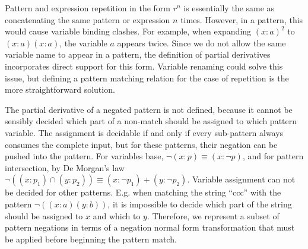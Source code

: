 Pattern and expression repetition in the form $r^n$ is essentially the same as
concatenating the same pattern or expression $n$ times. However, in a pattern,
this would cause variable binding clashes. For example, when expanding
$(x:a)^2$ to $(x:a)(x:a)$, the variable $a$ appears twice. Since we do not
allow the same variable name to appear in a pattern, the definition of partial
derivatives incorporates direct support for this form. Variable renaming could
solve this issue, but defining a pattern matching relation for the case of
repetition is the more straightforward solution.

The partial derivative of a negated pattern is not defined, because it cannot
be sensibly decided which part of a non-match should be assigned to which
pattern variable. The assignment is decidable if and only if every sub-pattern
always consumes the complete input, but for these patterns, their negation can
be pushed into the pattern. For variables base, $\neg(x:p) \equiv (x:\neg p)$,
and for pattern intersection, by De Morgan's law $\neg((x:p_1) \cap (y:p_2))
\equiv (x:\neg p_1) + (y:\neg p_2)$. Variable assignment can not be decided
for other patterns. E.g. when matching the string ``ccc'' with the pattern
$\neg((x:a)(y:b))$, it is impossible to decide which part of the string should
be assigned to $x$ and which to $y$. Therefore, we represent a subset of
pattern negations in terms of a negation normal form transformation that must
be applied before beginning the pattern match.

